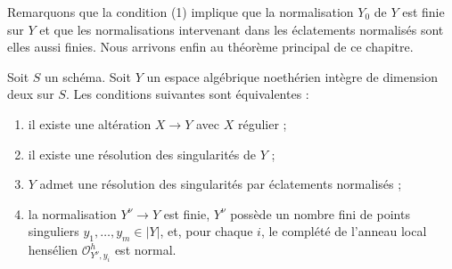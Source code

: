\noindent
Remarquons que la condition (1) implique que la normalisation $Y_0$ de $Y$
est finie sur $Y$ et que les normalisations intervenant dans les éclatements
normalisés sont elles aussi finies.
Nous arrivons enfin au théorème principal de ce chapitre.

\begin{theorem}
\label{theorem-resolve}
Soit $S$ un schéma. Soit $Y$ un espace algébrique noethérien intègre de
dimension deux sur $S$. Les conditions suivantes sont équivalentes :
\begin{enumerate}
\item il existe une altération $X \to Y$ avec $X$ régulier ;
\item il existe une résolution des singularités de $Y$ ;
\item $Y$ admet une résolution des singularités par éclatements normalisés ;
\item la normalisation $Y^\nu \to Y$ est finie, $Y^\nu$ possède un nombre
fini de points singuliers $y_1, \ldots, y_m \in |Y|$, et, pour chaque $i$,
le complété de l'anneau local hensélien $\mathcal{O}_{Y^\nu, y_i}^h$ est
normal.
\end{enumerate}
\end{theorem}

